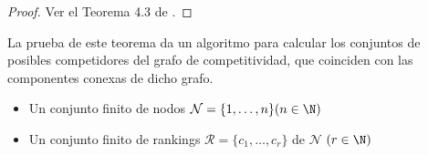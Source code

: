 \begin{proof}
Ver el Teorema 4.3 de \cite{journals/corr/CriadoGPR13a}.
\end{proof}

La prueba de este teorema da un algoritmo para calcular los conjuntos de posibles competidores del grafo de competitividad, que coinciden con las componentes conexas de dicho grafo.

\begin{algorithm}\label{algoritmo}
 \Input{}
 \begin{itemize}
 	\item Un conjunto finito de nodos $\mathcal{N} = \{1,\dots, n\} (n \in \N)$
 	\item Un conjunto finito de rankings $\mathcal{R} = \{c_1,\dots,c_r\}$ de $\mathcal{N}$ $(r \in \N)$
 \end{itemize}
 
 
 
 \end{algorithm}


